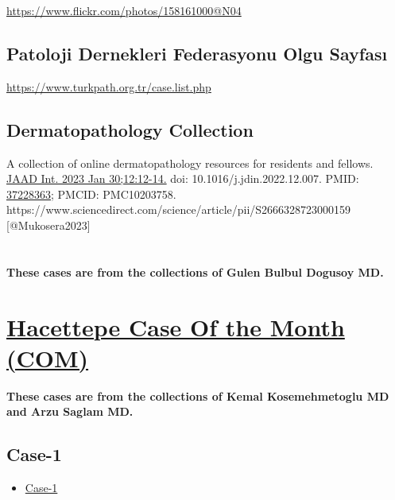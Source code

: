 \documentclass[
  letterpaper,
  paper=6in:9in,
  pagesize=pdftex,
  headinclude=on,
  footinclude=on,
  12pt]{scrbook}
\providecommand{\tightlist}{%
  \setlength{\itemsep}{0pt}\setlength{\parskip}{0pt}}\usepackage{longtable,booktabs,array}
\begin{document}
\url{https://www.flickr.com/photos/158161000@N04}

\hypertarget{patoloji-dernekleri-federasyonu-olgu-sayfasux131}{%
\section{Patoloji Dernekleri Federasyonu Olgu
Sayfası}\label{patoloji-dernekleri-federasyonu-olgu-sayfasux131}}

\url{https://www.turkpath.org.tr/case.list.php}

\hypertarget{dermatopathology-collection}{%
\section{Dermatopathology
Collection}\label{dermatopathology-collection}}

A collection of online dermatopathology resources for residents and
fellows.
\href{https://www.jaadinternational.org/article/S2666-3287(23)00015-9/fulltext}{JAAD
Int. 2023 Jan 30;12:12-14.} doi: 10.1016/j.jdin.2022.12.007. PMID:
\href{https://pubmed.ncbi.nlm.nih.gov/37228363/}{37228363}; PMCID:
PMC10203758.
https://www.sciencedirect.com/science/article/pii/S2666328723000159
{[}@Mukosera2023{]}

\hypertarget{section-4}{%
\chapter{}\label{section-4}}

\textbf{These cases are from the collections of Gulen Bulbul Dogusoy
MD.}

\hypertarget{sec-hacettepe-case-of-the-month}{%
\chapter{\texorpdfstring{\href{https://hacettepepathology.com/}{Hacettepe
Case Of the Month
(COM)}}{Hacettepe Case Of the Month (COM)}}\label{sec-hacettepe-case-of-the-month}}

\textbf{These cases are from the collections of Kemal Kosemehmetoglu MD
and Arzu Saglam MD.}

\hypertarget{sec-hacettepe-case-of-the-month-case-1}{%
\section{Case-1}\label{sec-hacettepe-case-of-the-month-case-1}}

\begin{itemize}
\tightlist
\item
  \href{https://www.youtube.com/watch?v=nfFtViUXHqU\&ab_channel=KemalKosemehmetoglu}{Case-1}
\end{itemize}
\end{document}
